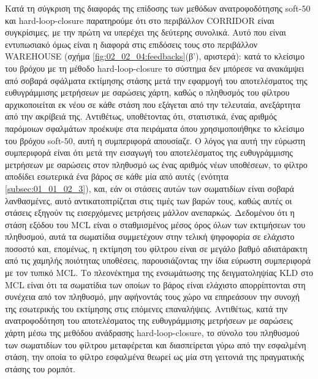 Κατά τη σύγκριση της διαφοράς της επίδοσης των μεθόδων ανατροφοδότησης
soft-$50$ και hard-loop-closure παρατηρούμε ότι στο περιβάλλον CORRIDOR είναι
συγκρίσιμες, με την πρώτη να υπερέχει της δεύτερης συνολικά. Αυτό που είναι
εντυπωσιακό όμως είναι η διαφορά στις επιδόσεις τους στο περιβάλλον WAREHOUSE
(σχήμα \ref{fig:02_02_04:feedbacks}(β'), αριστερά): κατά το κλείσιμο του βρόχου
με τη μέθοδο hard-loop-closure το σύστημα δεν μπόρεσε να ανακάμψει από σοβαρά
σφάλματα εκτίμησης στάσης μετά την εφαρμογή του αποτελέσματος της ευθυγράμμισης
μετρήσεων με σαρώσεις χάρτη, καθώς ο πληθυσμός του φίλτρου αρχικοποιείται εκ
νέου σε κάθε στάση που εξάγεται από την τελευταία, ανεξάρτητα από την ακρίβειά
της. Αντιθέτως, υποθέτοντας ότι, στατιστικά, ένας αριθμός παρόμοιων σφαλμάτων
προέκυψε στα πειράματα όπου χρησιμοποιήθηκε το κλείσιμο του βρόχου soft-$50$,
αυτή η συμπεριφορά απουσίαζε. Ο λόγος για αυτή την εύρωστη συμπεριφορά είναι
ότι μετά την εισαγωγή του αποτελέσματος της ευθυγράμμισης μετρήσεων με σαρώσεις
στον πληθυσμό ως ένας αριθμός νέων υποθέσεων, το φίλτρο αποδίδει εσωτερικά ένα
βάρος σε κάθε μία από αυτές (ενότητα \ref{subsec:01_01_02_3}), και, εάν οι
στάσεις αυτών των σωματιδίων είναι σοβαρά λανθασμένες, αυτό αντικατοπτρίζεται
στις τιμές των βαρών τους, καθώς αυτές οι στάσεις εξηγούν τις εισερχόμενες
μετρήσεις μάλλον ανεπαρκώς. Δεδομένου ότι η στάση εξόδου του MCL είναι ο
σταθμισμένος μέσος όρος όλων των εκτιμήσεων του πληθυσμού, αυτά τα σωματίδια
συμμετέχουν στην τελική ψηφοφορία σε ελάχιστο ποσοστό και, επομένως, η εκτίμηση
του φίλτρου είναι σε μεγάλο βαθμό αδιατάρακτη από τις χαμηλής ποιότητας
υποθέσεις, παρουσιάζοντας την ίδια εύρωστη συμπεριφορά με τον τυπικό MCL. Το
πλεονέκτημα της ενσωμάτωσης της δειγματοληψίας KLD στο MCL είναι ότι τα
σωματίδια των οποίων το βάρος είναι ελάχιστο απορρίπτονται στη συνέχεια από τον
πληθυσμό, μην αφήνοντάς τους χώρο να επηρεάσουν την συνοχή της εσωτερικής του
εκτίμησης στις επόμενες επαναλήψεις. Αντιθέτως, κατά την ανατροφοδότηση του
αποτελέσματος της ευθυγράμμισης μετρήσεων με σαρώσεις χάρτη μέσω της μεθόδου
ανάδρασης hard-loop-closure, το σύνολο του πληθυσμού των σωματιδίων του φίλτρου
μεταφέρεται και διασπείρεται γύρω από την εσφαλμένη στάση, την οποία το φίλτρο
εσφαλμένα θεωρεί ως μία στη γειτονιά της πραγματικής στάσης του ρομπότ.
